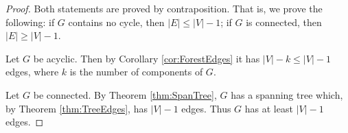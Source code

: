 

\setcounter{section}{2}
\setcounter{subsection}{5}
\setcounter{dfn}{12}

\begin{proof}
Both statements are proved by contraposition.
That is, we prove the following: if $G$ contains no cycle, then $|E| \le |V| - 1$; if $G$ is connected, then $|E| \ge |V| - 1$.

Let $G$ be acyclic.
Then by Corollary \ref{cor:ForestEdges} it has $|V| - k \le |V| - 1$ edges, where $k$ is the number of components of $G$.

Let $G$ be connected.
By Theorem \ref{thm:SpanTree}, $G$ has a spanning tree which, by Theorem \ref{thm:TreeEdges}, has $|V| - 1$ edges.
Thus $G$ has at least $|V| - 1$ edges.
\end{proof}





